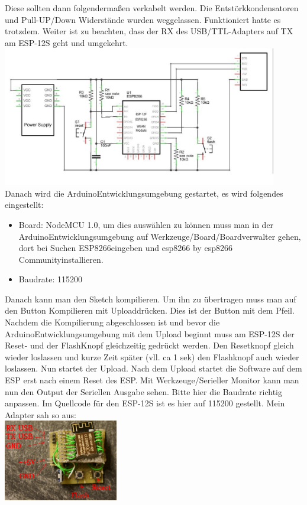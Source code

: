 \documentclass[11pt,fleqn]{book} %
\numberwithin{equation}{section} %
\numberwithin{figure}{section} %
\numberwithin{table}{section} %
\begin{document}
Diese sollten dann folgendermaßen verkabelt werden. Die Entstörkkondensatoren und Pull-UP/Down Widerstände wurden weggelassen. Funktioniert hatte es trotzdem. Weiter ist zu beachten, dass der RX des USB/TTL-Adapters auf TX am ESP-12S geht und umgekehrt.\\
\includegraphics[width=12cm]{Pictures/espwiring.jpg}\\
Danach wird die ArduinoEntwicklungsumgebung gestartet, es wird folgendes eingestellt:
\begin{itemize}
 \item Board: NodeMCU 1.0, um dies auswählen zu können muss man in der ArduinoEntwicklungsumgebung auf Werkzeuge/Board/Boardverwalter gehen, dort bei Suchen \glqq ESP8266\grqq eingeben und \glqq esp8266 by esp8266 Community\grqq installieren.
 \item Baudrate: 115200
\end{itemize}
Danach kann man den Sketch kompilieren. Um ihn zu übertragen muss man auf den Button \glqq Kompilieren mit Upload\grqq drücken. Dies ist der Button mit dem Pfeil. Nachdem die Kompilierung abgeschlossen ist und bevor die ArduinoEntwicklungsumgebung mit dem Upload beginnt muss am ESP-12S der Reset- und der FlashKnopf gleichzeitig gedrückt werden. Den Resetknopf gleich wieder loslassen und kurze Zeit später (vll. ca 1 sek) den Flashknopf auch wieder loslassen. Nun startet der Upload. Nach dem Upload startet die Software auf dem ESP erst nach einem Reset des ESP. Mit Werkzeuge/Serieller Monitor kann man nun den Output der Seriellen Ausgabe sehen. Bitte hier die Baudrate richtig anpassen. Im Quellcode für den ESP-12S ist es hier auf 115200 gestellt. Mein Adapter sah so aus:\\
\includegraphics[width=5cm]{Pictures/DSC01318.jpg}\\ \\
\end{document}
